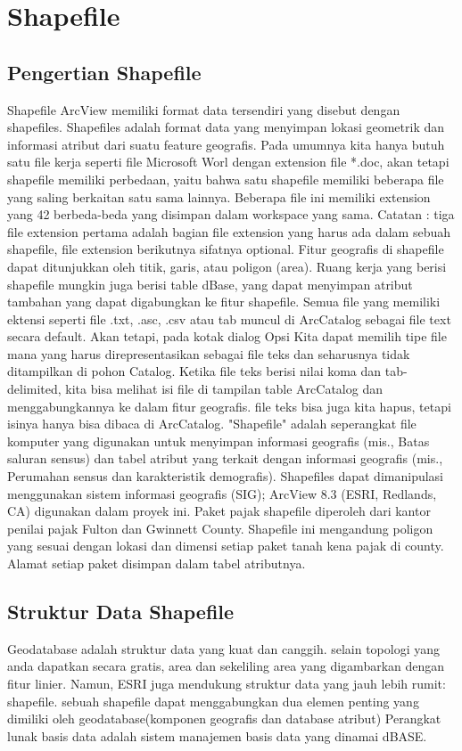 

\section{Shapefile}
\subsection{Pengertian Shapefile}
Shapefile ArcView memiliki format data tersendiri yang disebut dengan shapefiles. 
Shapefiles adalah format data yang menyimpan lokasi geometrik dan informasi atribut dari suatu feature geografis. 
Pada umumnya kita hanya butuh satu file kerja seperti file Microsoft Worl dengan extension file *.doc, 
akan tetapi shapefile memiliki perbedaan, yaitu bahwa satu shapefile memiliki beberapa file yang saling berkaitan satu sama lainnya. 
Beberapa file ini memiliki extension yang 42 berbeda-beda yang disimpan dalam workspace yang sama.
Catatan : tiga file extension pertama adalah bagian file extension yang harus ada dalam sebuah shapefile, file extension berikutnya sifatnya optional.
Fitur geografis di shapefile dapat ditunjukkan oleh titik, garis, atau poligon (area). Ruang kerja yang berisi shapefile
mungkin juga berisi table dBase, yang dapat menyimpan atribut tambahan yang dapat digabungkan ke fitur shapefile.
Semua file yang memiliki ektensi seperti file .txt, .asc, .csv atau tab muncul di ArcCatalog sebagai file text secara default.
Akan tetapi, pada kotak dialog Opsi Kita dapat memilih tipe file mana yang harus direpresentasikan sebagai file
teks dan seharusnya tidak ditampilkan di pohon Catalog. Ketika file teks berisi nilai koma dan tab-delimited,
kita bisa melihat isi file di tampilan table ArcCatalog dan menggabungkannya ke dalam fitur geografis. file teks bisa juga kita hapus, tetapi isinya hanya bisa dibaca di ArcCatalog.
"Shapefile" adalah seperangkat file komputer yang digunakan untuk menyimpan informasi geografis (mis., Batas saluran sensus) dan tabel atribut yang terkait dengan informasi geografis (mis., Perumahan sensus dan karakteristik demografis). Shapefiles dapat dimanipulasi menggunakan sistem informasi geografis (SIG); ArcView 8.3 (ESRI, Redlands, CA) digunakan dalam proyek ini. Paket pajak shapefile diperoleh dari kantor penilai pajak Fulton dan Gwinnett County. Shapefile ini mengandung poligon yang sesuai dengan lokasi dan dimensi setiap paket tanah kena pajak di county. Alamat setiap paket disimpan dalam tabel atributnya.

\subsection{Struktur Data Shapefile}
Geodatabase adalah struktur data yang kuat dan canggih. selain topologi yang anda dapatkan secara 
gratis, area dan sekeliling area yang digambarkan dengan fitur linier. Namun, ESRI juga mendukung 
struktur data yang jauh lebih rumit: shapefile. sebuah shapefile dapat menggabungkan dua elemen 
penting yang dimiliki oleh geodatabase(komponen geografis dan database atribut) Perangkat lunak 
basis data adalah sistem manajemen basis data yang dinamai dBASE. 
